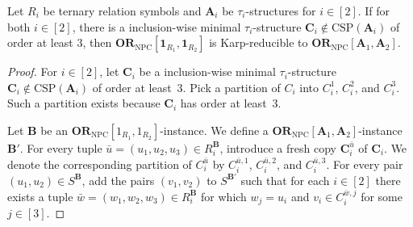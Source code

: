 \documentclass[a4paper,english, thm-restate]{lipics-v2021}
\newcommand{\tup}[1]{\bar{#1}}
\newcommand{\sig}{\tau}
\newcommand{\StructA}{\mathbf{A}}
\newcommand{\StructB}{\mathbf{B}}
\newcommand{\StructC}{\mathbf{C}}
\newcommand{\CSP}[1]{\mathrm{CSP}(#1)}
\newcommand{\ORNPC}[1]{\mathbf{OR}_\text{NPC}[#1]}
\newcommand{\onestruc}[1]{\mathbf{1}_{#1}}
\begin{document}
	\begin{lemma}
		\label{lem:intractable-or-NPC-reduce}
		Let $R_i$ be ternary relation symbols
		and $\StructA_i$ be $\sig_i$-structures for $i\in[2]$.
		If for both $i \in [2]$,
		there is a inclusion-wise minimal $\sig_i$-structure $\StructC_i \notin \CSP{\StructA_i}$
		of order at  least $3$,
		then $\ORNPC{\onestruc{R_1}, \onestruc{R_2}}$ is Karp-reducible to $\ORNPC{\StructA_1,\StructA_2}$.
	\end{lemma}
	\begin{proof}
		For $i\in[2]$,
		let $\StructC_i$ be a inclusion-wise minimal $\sig_i$-structure $\StructC_i  \notin \CSP{\StructA_i}$ of order at least~$3$.
		Pick a partition of $C_i$ into $C_i^1$, $C_i^2$, and $C_i^3$.
		Such a partition exists because $\StructC_i$ has order at least~$3$.
		
		Let $\StructB$ be an $\ORNPC{1_{R_1}, 1_{R_2}}$-instance.
		We define a $\ORNPC{\StructA_1,\StructA_2}$-instance $\StructB'$.
		For every tuple $\tup{u} = (u_1, u_2, u_3) \in R_i^{\StructB}$,
		introduce a fresh copy $\StructC_i^{\tup{u}}$ of $\StructC_i$.
		We denote the corresponding partition of $C_i^{\tup{u}}$
		by $C_i^{\tup{u},1}$, $C_i^{\tup{u},2}$, and $C_i^{\tup{u},3}$.
		For every pair $(u_1, u_2) \in S^\StructB$,
		add the pairs $(v_1,v_2)$ to $S^{\StructB'}$
		such that for each $i\in[2]$ there exists a tuple $\tup{w}=(w_1,w_2,w_3) \in R_i^{\StructB}$
		for which $w_j = u_i$ and $v_i \in C_i^{\tup{w},j}$ for some $j \in [3]$.
		

\end{proof}
\end{document}
